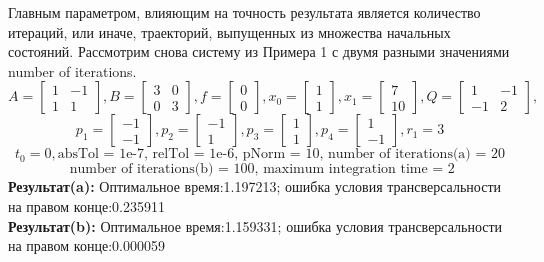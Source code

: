 \documentclass[10pt]{article}
\begin{document}
Главным параметром, влияющим на точность результата является количество итераций, или иначе, траекторий, выпущенных из множества начальных состояний. Рассмотрим снова систему из Примера 1 с двумя разными значениями number of iterations.
\[ A = \begin{bmatrix}
      		1 & -1 \\[0.3em]
      		1 & 1
      	  \end{bmatrix} , 
 B = \begin{bmatrix}
      	   3 & 0 \\[0.3em]
      	   0 & 3
      \end{bmatrix} ,
 f = \begin{bmatrix}
       	    0 \\[0.3em]
      	    0
      \end{bmatrix} ,
 x_0 = \begin{bmatrix}
      	    1 \\[0.3em]
      	    1
      \end{bmatrix} ,
 x_1 = \begin{bmatrix}
      	7 \\[0.3em]
      	10
      \end{bmatrix} ,
 Q = \begin{bmatrix}
      	   1 & -1 \\[0.3em]
      	   -1 & 2
      \end{bmatrix}, \]
\[ p_1 = \begin{bmatrix}
      	-1 \\[0.3em]
      	-1
      \end{bmatrix} ,
p_2 = \begin{bmatrix}
      	-1 \\[0.3em]
      	1
      \end{bmatrix} ,
p_3 = \begin{bmatrix}
      	1 \\[0.3em]
      	1
      \end{bmatrix} ,
p_4 = \begin{bmatrix}
      	1 \\[0.3em]
      	-1
      \end{bmatrix}, r_1 = 3 \]
\[ t_0 = 0, \text{absTol = 1e-7, relTol = 1e-6, pNorm = 10, number of iterations(a) = 20} \]  
\[\text{ number of iterations(b) = 100, maximum integration time = 2} \]
\textbf{Результат(a):} Оптимальное время:1.197213; ошибка условия трансверсальности на правом конце:0.235911 \\
\textbf{Результат(b):} Оптимальное время:1.159331; ошибка условия трансверсальности на правом конце:0.000059
\end{document}
